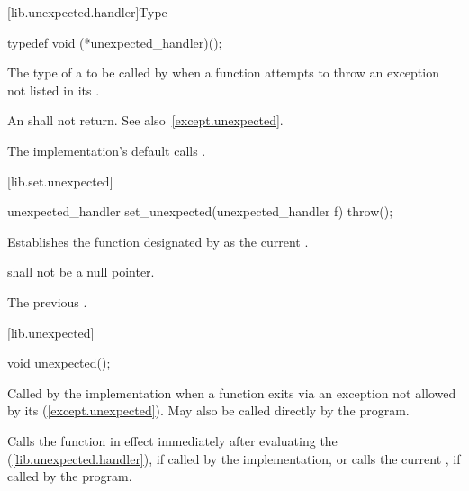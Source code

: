 [lib.unexpected.handler]{Type }

%
\begin{itemdecl}
typedef void (*unexpected_handler)();
\end{itemdecl}

\begin{itemdescr}
\pnum
The type of a
to be called by
when a function attempts to throw an exception not listed in its
.

\pnum
\required
An
shall not return.
See also~\ref{except.unexpected}.

\pnum
{}
The implementation's default  calls
.
\end{itemdescr}

[lib.set.unexpected]{}

%
\begin{itemdecl}
unexpected_handler set_unexpected(unexpected_handler f) throw();
\end{itemdecl}

\begin{itemdescr}
\pnum
\effects
Establishes the function designated by  as the current
.

\pnum
\requires {} shall not be a null pointer.

\pnum
\returns
The previous .
\end{itemdescr}

[lib.unexpected]{}

%
\begin{itemdecl}
void unexpected();
\end{itemdecl}

\begin{itemdescr}
\pnum
Called by the implementation when a function exits via an exception not allowed by its
(\ref{except.unexpected}).
May also be called directly by the program.

\pnum
\effects
Calls the  function in effect immediately after
evaluating the 
(\ref{lib.unexpected.handler}),
if called by the implementation, or calls the current
, if called by the program.
\end{itemdescr}

